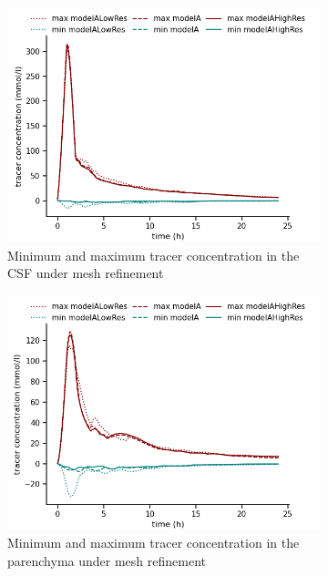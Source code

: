 \begin{figure}
    \centering
    \begin{subfigure}[b]{0.45\textwidth}
        \centering
        \includegraphics[width = 1 \linewidth]{figures/csf_minmax.png}
        \caption{Minimum and maximum tracer concentration in the CSF under mesh refinement}
    \end{subfigure}
    \begin{subfigure}[b]{0.45\textwidth}
        \centering
     \includegraphics[width= 1 \linewidth]{figures/par_minmax.png}
        \caption{Minimum and maximum tracer concentration in the parenchyma under mesh refinement}
    \end{subfigure}
    \begin{subfigure}[b]{0.45\textwidth}

\end{subfigure}
\end{figure}

